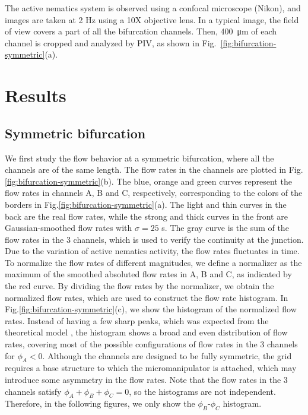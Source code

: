 \documentclass[%
10pt,
superscriptaddress,
twocolumn,
 amsmath,amssymb,
 aps,prx,
]{revtex4-2}
\begin{document}
The active nematics system is observed using a confocal microscope (Nikon), and images are taken at 2 Hz using a 10X objective lens.
In a typical image, the field of view covers a part of all the bifurcation channels.
Then, \SI{400}{\micro\meter} of each channel is cropped and analyzed by PIV, as shown in Fig.~\ref{fig:bifurcation-symmetric}(a).

\section{Results}

\subsection{Symmetric bifurcation}

We first study the flow behavior at a symmetric bifurcation, where all the channels are of the same length.
The flow rates in the channels are plotted in Fig.\ref{fig:bifurcation-symmetric}(b).
The blue, orange and green curves represent the flow rates in channels A, B and C, respectively, corresponding to the colors of the borders in Fig.\ref{fig:bifurcation-symmetric}(a).
The light and thin curves in the back are the real flow rates, while the strong and thick curves in the front are Gaussian-smoothed flow rates with $\sigma=25$ s.
The gray curve is the sum of the flow rates in the 3 channels, which is used to verify the continuity at the junction.
Due to the variation of active nematics activity, the flow rates fluctuates in time. 
To normalize the flow rates of different magnitudes, we define a normalizer as the maximum of the smoothed absoluted flow rates in A, B and C, as indicated by the red curve. 
By dividing the flow rates by the normalizer, we obtain the normalized flow rates, which are used to construct the flow rate histogram.
In Fig.\ref{fig:bifurcation-symmetric}(c), we show the histogram of the normalized flow rates.
Instead of having a few sharp peaks, which was expected from the theoretical model \cite{Woodhouse2017}, the histogram shows a broad and even distribution of flow rates, covering most of the possible configurations of flow rates in the 3 channels for $\phi_A<0$.
Although the channels are designed to be fully symmetric, the grid requires a base structure to which the micromanipulator is attached, which may introduce some asymmetry in the flow rates.
Note that the flow rates in the 3 channels satisfy $\phi_A+\phi_B+\phi_C = 0$, so the histograms are not independent.
Therefore, in the following figures, we only show the $\phi_B$-$\phi_C$ histogram.
\end{document}
